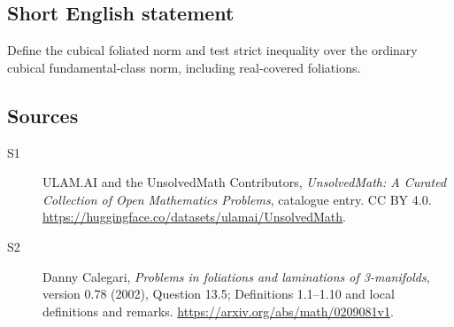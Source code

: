 \documentclass[11pt]{article}
\begin{document}
\subsection{Short English statement}
Define the cubical foliated norm and test strict inequality over the ordinary cubical fundamental-class norm, including real-covered foliations.
\subsection{Sources}
\begin{description}
\item[\hypertarget{source:statement:1}{S1}] ULAM.AI and the UnsolvedMath Contributors, \emph{UnsolvedMath: A Curated Collection of Open Mathematics Problems}, catalogue entry. CC BY 4.0. \url{https://huggingface.co/datasets/ulamai/UnsolvedMath}.
\item[\hypertarget{source:statement:2}{S2}] Danny Calegari, \emph{Problems in foliations and laminations of 3-manifolds}, version 0.78 (2002), Question 13.5; Definitions 1.1--1.10 and local definitions and remarks. \url{https://arxiv.org/abs/math/0209081v1}.
\end{description}
\label{end:statement}
\end{document}
